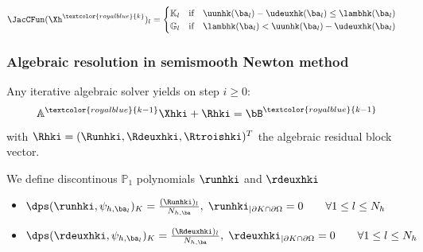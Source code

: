\documentclass{beamer}
\begin{document}
\begin{frame}
\begin{equation*}
\JacCFun(\Xh^{\textcolor{royalblue}{k}})_l
=
\begin{cases}
\mathbb{K}_l \quad \mbox{if} \quad \uunhk(\ba_l)-\udeuxhk(\ba_l) \leq \lambhk(\ba_l)\\
\mathbb{G}_l \quad \mbox{if} \quad \lambhk(\ba_l) < \uunhk(\ba_l)-\udeuxhk(\ba_l)
\end{cases}
\end{equation*}
\end{frame}
%
\begin{frame}
\frametitle{Algebraic resolution in semismooth Newton method}
\vspace{-0.1 cm}Any iterative algebraic
solver yields on step $i \geq 0$:
\begin{equation*}
\mathbb{A}^{\textcolor{royalblue}{k-1}}\Xhki + \Rhki=\bB^{\textcolor{royalblue}{k-1}}
\end{equation*}
with $\Rhki=(\Runhki,\Rdeuxhki,\Rtroishki)^{T}$ the algebraic residual block vector.
\begin{definition}
We define discontinous $\mathbb{P}_1$ polynomials $\runhki$ and $\rdeuxhki$ %
\begin{itemize}
\item $\dps (\runhki, \psi_{h,\ba_l})_K=\frac{(\Runhki)_l}{N_{h,\ba}}, \; {\runhki}_{|\partial K \cap \partial \Omega} =0 \qquad \forall 1 \leq l \leq N_h$
\item $\dps (\rdeuxhki, \psi_{h,\ba_l})_K=\frac{(\Rdeuxhki)_l}{N_{h,\ba}}, \; {\rdeuxhki}_{|\partial K \cap \partial \Omega} =0 \qquad \forall 1 \leq l \leq N_h$
\end{itemize}
\end{definition}


\end{frame}
\end{document}
